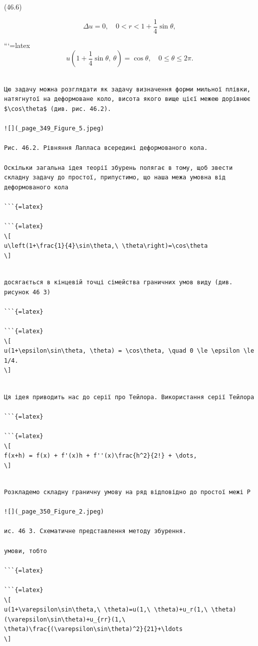 \documentclass[
]{article}
\begin{document}
(46.6)

\[
\Delta u = 0, \quad 0 < r < 1 + \frac{1}{4} \sin \theta,
\]

```{=latex}
\[
u \left( 1 + \frac{1}{4} \sin \theta, \ \theta \right) = \cos \theta, \quad 0 \le \theta \le 2\pi.
\]

\begin{verbatim}

Цю задачу можна розглядати як задачу визначення форми мильної плівки, натягнутої на деформоване коло, висота якого вище цієї межею дорівнює $\cos\theta$ (див. рис. 46.2).

![](_page_349_Figure_5.jpeg)

Рис. 46.2. Рівняння Лапласа всередині деформованого кола.

Оскільки загальна ідея теорії збурень полягає в тому, щоб звести складну задачу до простої, припустимо, що наша межа умовна від деформованого кола

```{=latex}

```{=latex}
\[
u\left(1+\frac{1}{4}\sin\theta,\ \theta\right)=\cos\theta
\]
\end{verbatim}

\begin{verbatim}

досягається в кінцевій точці сімейства граничних умов виду (див. рисунок 46 3)

```{=latex}

```{=latex}
\[
u(1+\epsilon\sin\theta, \theta) = \cos\theta, \quad 0 \le \epsilon \le 1/4.
\]
\end{verbatim}

\begin{verbatim}

Ця ідея приводить нас до серії про Тейлора. Використання серії Тейлора

```{=latex}

```{=latex}
\[
f(x+h) = f(x) + f'(x)h + f''(x)\frac{h^2}{2!} + \dots,
\]
\end{verbatim}

\begin{verbatim}

Розкладемо складну граничну умову на ряд відповідно до простої межі Р

![](_page_350_Figure_2.jpeg)

ис. 46 3. Схематичне представлення методу збурення.

умови, тобто

```{=latex}

```{=latex}
\[
u(1+\varepsilon\sin\theta,\ \theta)=u(1,\ \theta)+u_r(1,\ \theta)(\varepsilon\sin\theta)+u_{rr}(1,\ \theta)\frac{(\varepsilon\sin\theta)^2}{21}+\ldots
\]
\end{verbatim}
\end{document}
